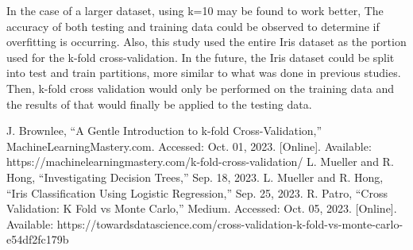 \documentclass[journal]{IEEEtran}
\begin{document}
In the case of a larger dataset, using k=10 may be found to work better, The accuracy of both testing and training data could be observed to determine if overfitting is occurring. Also, this study used the entire Iris dataset as the portion used for the k-fold cross-validation. In the future, the Iris dataset could be split into test and train partitions, more similar to what was done in previous studies. Then, k-fold cross validation would only be performed on the training data and the results of that would finally be applied to the testing data.

\newpage

\begin{thebibliography}{00}
J. Brownlee, “A Gentle Introduction to k-fold Cross-Validation,” MachineLearningMastery.com. Accessed: Oct. 01, 2023. [Online]. Available: https://machinelearningmastery.com/k-fold-cross-validation/
L. Mueller and R. Hong, “Investigating Decision Trees,” Sep. 18, 2023.
L. Mueller and R. Hong, “Iris Classification Using Logistic Regression,” Sep. 25, 2023.
R. Patro, “Cross Validation: K Fold vs Monte Carlo,” Medium. Accessed: Oct. 05, 2023. [Online]. Available: https://towardsdatascience.com/cross-validation-k-fold-vs-monte-carlo-e54df2fc179b

\end{thebibliography}
\end{document}
